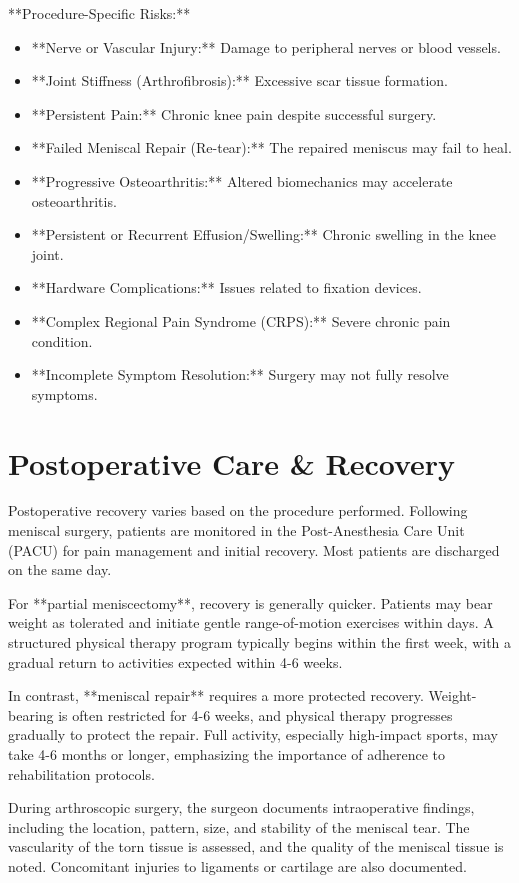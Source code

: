 **Procedure-Specific Risks:**
\begin{itemize}
  \item **Nerve or Vascular Injury:** Damage to peripheral nerves or blood vessels.
  \item **Joint Stiffness (Arthrofibrosis):** Excessive scar tissue formation.
  \item **Persistent Pain:** Chronic knee pain despite successful surgery.
  \item **Failed Meniscal Repair (Re-tear):** The repaired meniscus may fail to heal.
  \item **Progressive Osteoarthritis:** Altered biomechanics may accelerate osteoarthritis.
  \item **Persistent or Recurrent Effusion/Swelling:** Chronic swelling in the knee joint.
  \item **Hardware Complications:** Issues related to fixation devices.
  \item **Complex Regional Pain Syndrome (CRPS):** Severe chronic pain condition.
  \item **Incomplete Symptom Resolution:** Surgery may not fully resolve symptoms.
\end{itemize}

\section*{Postoperative Care \& Recovery}
Postoperative recovery varies based on the procedure performed. Following meniscal surgery, patients are monitored in the Post-Anesthesia Care Unit (PACU) for pain management and initial recovery. Most patients are discharged on the same day.

For **partial meniscectomy**, recovery is generally quicker. Patients may bear weight as tolerated and initiate gentle range-of-motion exercises within days. A structured physical therapy program typically begins within the first week, with a gradual return to activities expected within 4-6 weeks.

In contrast, **meniscal repair** requires a more protected recovery. Weight-bearing is often restricted for 4-6 weeks, and physical therapy progresses gradually to protect the repair. Full activity, especially high-impact sports, may take 4-6 months or longer, emphasizing the importance of adherence to rehabilitation protocols.

During arthroscopic surgery, the surgeon documents intraoperative findings, including the location, pattern, size, and stability of the meniscal tear. The vascularity of the torn tissue is assessed, and the quality of the meniscal tissue is noted. Concomitant injuries to ligaments or cartilage are also documented.

